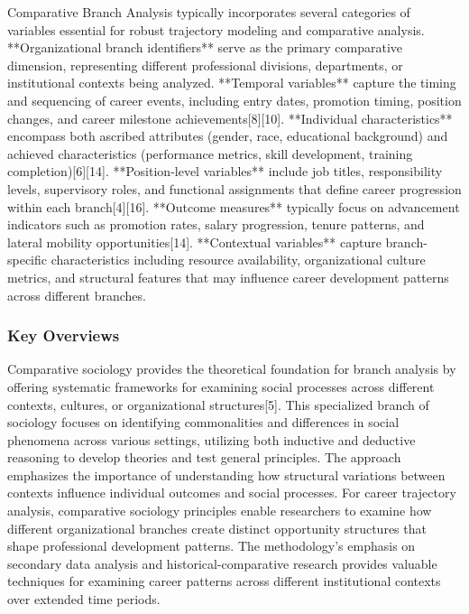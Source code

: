 \documentclass[main.tex]{subfiles}
\begin{document}
Comparative Branch Analysis typically incorporates several categories of variables essential for robust trajectory modeling and comparative analysis. **Organizational branch identifiers** serve as the primary comparative dimension, representing different professional divisions, departments, or institutional contexts being analyzed. **Temporal variables** capture the timing and sequencing of career events, including entry dates, promotion timing, position changes, and career milestone achievements[8][10]. **Individual characteristics** encompass both ascribed attributes (gender, race, educational background) and achieved characteristics (performance metrics, skill development, training completion)[6][14]. **Position-level variables** include job titles, responsibility levels, supervisory roles, and functional assignments that define career progression within each branch[4][16]. **Outcome measures** typically focus on advancement indicators such as promotion rates, salary progression, tenure patterns, and lateral mobility opportunities[14]. **Contextual variables** capture branch-specific characteristics including resource availability, organizational culture metrics, and structural features that may influence career development patterns across different branches.

\subsubsection{Key Overviews}


Comparative sociology provides the theoretical foundation for branch analysis by offering systematic frameworks for examining social processes across different contexts, cultures, or organizational structures[5]. This specialized branch of sociology focuses on identifying commonalities and differences in social phenomena across various settings, utilizing both inductive and deductive reasoning to develop theories and test general principles. The approach emphasizes the importance of understanding how structural variations between contexts influence individual outcomes and social processes. For career trajectory analysis, comparative sociology principles enable researchers to examine how different organizational branches create distinct opportunity structures that shape professional development patterns. The methodology's emphasis on secondary data analysis and historical-comparative research provides valuable techniques for examining career patterns across different institutional contexts over extended time periods.
\end{document}
